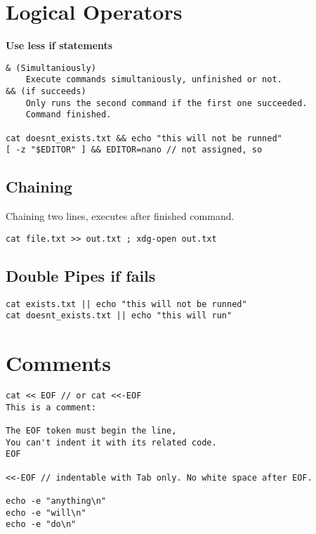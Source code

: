 \section{Logical Operators}

\textbf{Use less if statements}

\begin{verbatim}
& (Simultaniously)
    Execute commands simultaniously, unfinished or not.
&& (if succeeds)
    Only runs the second command if the first one succeeded.
    Command finished.

cat doesnt_exists.txt && echo "this will not be runned" 
[ -z "$EDITOR" ] && EDITOR=nano // not assigned, so
\end{verbatim}

\subsection{Chaining}

Chaining two lines, executes after finished command.

\begin{verbatim}
cat file.txt >> out.txt ; xdg-open out.txt 
\end{verbatim}

\subsection{Double Pipes if fails}

\begin{verbatim}
cat exists.txt || echo "this will not be runned" 
cat doesnt_exists.txt || echo "this will run" 
\end{verbatim}

\section{Comments}

\begin{verbatim}
cat << EOF // or cat <<-EOF
This is a comment:

The EOF token must begin the line,
You can't indent it with its related code. 
EOF

<<-EOF // indentable with Tab only. No white space after EOF.

echo -e "anything\n"
echo -e "will\n"
echo -e "do\n"
\end{verbatim}

